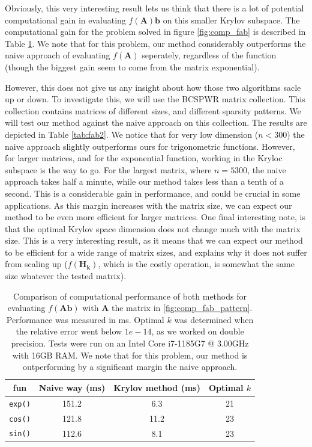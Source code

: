 \documentclass[11pt]{article}
\numberwithin{equation}{section}
\begin{document}
Obviously, this very interesting result lets us think that there is a lot of potential computational gain in evaluating $f(\mathbf{A})\mathbf{b}$ on this smaller Krylov subspace. The computational gain for the problem solved in figure \ref{fig:comp_fab} is described in Table \ref{tab:fab}. We note that for this problem, our method considerably outperforms the naive approach of evaluating $f(\mathbf{A})$ seperately, regardless of the function (though the biggest gain seem to come from the matrix exponential). 

However, this does not give us any insight about how those two algorithms sacle up or down. To investigate this, we will use the BCSPWR matrix collection. This collection contains matrices of different sizes, and different sparsity patterns. We will test our method against the naive approach on this collection. The results are depicted in Table \ref{tab:fab2}. We notice that for very low dimension ($n < 300$) the naive approach slightly outperforms ours for trigonometric functions. However, for larger matrices, and for the exponential function, working in the Kryloc subspace is the way to go. For the largest matrix, where $n=5300$, the naive approach takes half a minute, while our method takes less than a tenth of a second. This is a considerable gain in performance, and could be crucial in some applications. As this margin increases with the matrix size, we can expect our method to be even more efficient for larger matrices. One final interesting note, is that the optimal Krylov space dimension does not change much with the matrix size. This is a very interesting result, as it means that we can expect our method to be efficient for a wide range of matrix sizes, and explains why it does not suffer from scaling up ($f(\mathbf{H_k})$, which is the costly operation, is somewhat the same size whatever the tested matrix).

\begin{table}
    \centering
    \caption{Comparison of computational performance of both methods for evaluating $f(\mathbf{A}\mathbf{b})$ with $\mathbf{A}$ the matrix in \ref{fig:comp_fab_pattern}. Performance was measured in ms. Optimal $k$ was determined when the relative error went below $1e-14$, as we worked on double precision. Tests were run on an Intel Core i7-1185G7 @ 3.00GHz with 16GB RAM. We note that for this problem, our method is outperforming by a significant margin the naive approach.}
    \begin{tabular}{|c|c|c|c|}
        \hline
        \textbf{fun} & \textbf{Naive way (ms)} & \textbf{Krylov method (ms)} & \textbf{Optimal $k$} \\\hline
        \texttt{exp()} & 151.2 & 6.3 & 21 \\ \hline
        \texttt{cos()} & 121.8 & 11.2 & 23 \\ \hline
        \texttt{sin()} & 112.6 & 8.1 & 23 \\
        \hline
    \end{tabular}
    \label{tab:fab}
\end{table}
\end{document}
